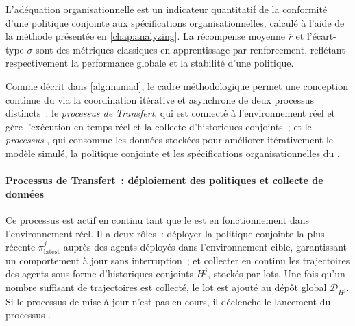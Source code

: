 L'adéquation organisationnelle est un indicateur quantitatif de la conformité d'une politique conjointe aux spécifications organisationnelles, calculé à l'aide de la méthode  présentée en \autoref{chap:analyzing}. La récompense moyenne $\overline{r}$ et l'écart-type $\sigma$ sont des métriques classiques en apprentissage par renforcement, reflétant respectivement la performance globale et la stabilité d'une politique.

\noindent Comme décrit dans \autoref{alg:mamad}, le cadre méthodologique permet une conception continue du  via la coordination itérative et asynchrone de deux processus distincts~: le \textit{processus de Transfert}, qui est connecté à l'environnement réel et gère l'exécution en temps réel et la collecte d'historiques conjoints~; et le \textit{processus }, qui consomme les données stockées pour améliorer itérativement le modèle simulé, la politique conjointe et les spécifications organisationnelles du .

\paragraph{Processus de Transfert~: déploiement des politiques et collecte de données}

Ce processus est actif en continu tant que le  est en fonctionnement dans l'environnement réel. Il a deux rôles~: déployer la politique conjointe la plus récente $\pi^j_{\text{latest}}$ auprès des agents déployés dans l'environnement cible, garantissant un comportement à jour sans interruption~; et collecter en continu les trajectoires des agents sous forme d'historiques conjoints $H^j$, stockés par lots. Une fois qu'un nombre suffisant de trajectoires est collecté, le lot est ajouté au dépôt global $\mathcal{D}_{H^j}$. Si le processus de mise à jour n'est pas en cours, il déclenche le lancement du processus \textit{}.


